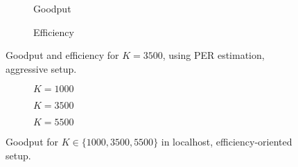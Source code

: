 \begin{figure}[h!]
\centering
\begin{subfigure}{0.23\textwidth}
	\captionsetup{justification=centering,font=scriptsize}
	\setlength\fwidth{\textwidth}
	\setlength{}
	
	\caption{Goodput}
	\label{fig:pm1_goodput}
\end{subfigure}\hspace{2em}%
\begin{subfigure}{0.23\textwidth}
	\captionsetup{justification=centering,font=scriptsize}
	\setlength\fwidth{\textwidth}
	\setlength{}
	
	\caption{Efficiency}
	\label{fig:pm1_efficiency}
\end{subfigure}
\caption{Goodput and efficiency for $K=3500$, using PER estimation, aggressive setup.}
\label{fig:pm1}
\end{figure}
\begin{figure}[!hp]
\centering
\begin{subfigure}{0.24\textwidth}
	\captionsetup{justification=centering,font=scriptsize}
	\centering
	\setlength\fwidth{\textwidth}
	\setlength{}
	
	\caption{$K=1000$}
	\label{fig:lh_good_1000_eff}
\end{subfigure}\hspace{2em}%
\begin{subfigure}{0.23\textwidth}
	\captionsetup{justification=centering,font=scriptsize}
	\centering
	\setlength\fwidth{\textwidth}
	\setlength{}
	
	\caption{$K=3500$}
	\label{fig:lh_good_3500_eff}
\end{subfigure}\hspace{2em}%
\begin{subfigure}{0.23\textwidth}
	\captionsetup{justification=centering,font=scriptsize}
	\centering
	\setlength\fwidth{\textwidth}
	\setlength{}
	
	\caption{$K=5500$}
	\label{fig:lh_good_5500_eff}
\end{subfigure}
\caption{Goodput for $K \in \{1000, 3500, 5500\}$ in localhost, efficiency-oriented setup.}
\label{fig:goodput_nonaggr}
\end{figure}

